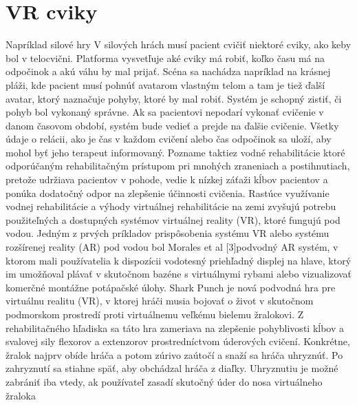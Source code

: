 \documentclass[10pt,oneside,slovak,a4paper]{article}
\begin{document}
\section{VR cviky} \label{VR rehabilitácie}
Napríklad
silové hry
V silových hrách musí pacient cvičiť niektoré cviky, ako keby bol v telocvični. Platforma vysvetľuje
aké cviky má robiť, koľko času má na odpočinok a akú váhu by mal prijať.
Scéna sa nachádza napríklad na krásnej pláži, kde pacient musí pohnúť avatarom vlastným telom a tam je
tiež ďalší avatar, ktorý naznačuje pohyby, ktoré by mal robiť.
Systém je schopný zistiť, či 
pohyb bol vykonaný správne. Ak sa pacientovi nepodarí vykonať cvičenie v danom časovom období,
systém bude vedieť a prejde na ďalšie cvičenie. Všetky údaje o relácii, ako je čas v každom cvičení alebo čas
odpočinok sa uloží, aby mohol byť jeho terapeut informovaný.
Pozname taktiez vodné rehabilitácie ktoré odporúčaným rehabilitačným prístupom pri mnohých zraneniach a postihnutiach, pretože udržiava pacientov v pohode, vedie k nízkej záťaži kĺbov pacientov a ponúka dodatočný odpor na zlepšenie účinnosti cvičenia. Rastúce využívanie vodnej rehabilitácie a výhody virtuálnej rehabilitácie na zemi zvyšujú potrebu použiteľných a dostupných systémov virtuálnej reality (VR), ktoré fungujú pod vodou. Jedným z prvých príkladov prispôsobenia systému VR alebo systému rozšírenej reality (AR) pod vodou bol Morales et al [3]podvodný AR systém, v ktorom mali používatelia k dispozícii vodotesný priehľadný displej na hlave, ktorý im umožňoval plávať v skutočnom bazéne s virtuálnymi rybami alebo vizualizovať komerčné montážne potápačské úlohy.
Shark Punch je nová podvodná hra pre virtuálnu realitu (VR), v ktorej hráči musia bojovať o život v skutočnom podmorskom prostredí proti virtuálnemu veľkému bielemu žralokovi. Z rehabilitačného hľadiska sa táto hra zameriava na zlepšenie pohyblivosti kĺbov a svalovej sily flexorov a extenzorov prostredníctvom úderových cvičení. Konkrétne, žralok najprv obíde hráča a potom zúrivo zaútočí a snaží sa hráča uhryznúť. Po zahryznutí sa stiahne späť, aby obchádzal hráča z diaľky. Uhryznutiu je možné zabrániť iba vtedy, ak používateľ zasadí skutočný úder do nosa virtuálneho žraloka 
\cite{PEDRAZAHUESO2015161}
\cite{doi:10.1089/109493103322011641}

\end{document}
